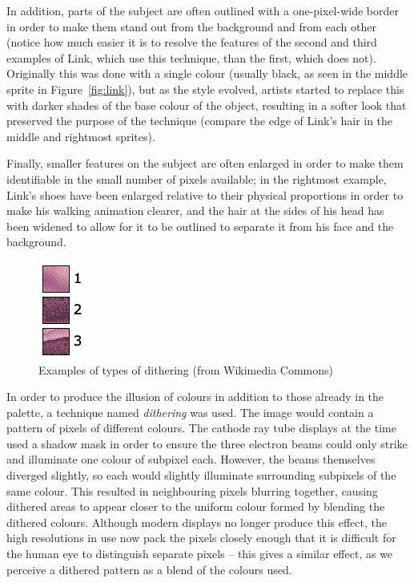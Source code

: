 \documentclass[12pt,twoside,notitlepage]{report}
\begin{document}
In addition, parts of the subject are often outlined with a one-pixel-wide border in order to make them stand out from the background and from each other (notice how much easier it is to resolve the features of the second and third examples of Link, which use this technique, than the first, which does not). Originally this was done with a single colour (usually black, as seen in the middle sprite in Figure~\ref{fig:link}), but as the style evolved, artists started to replace this with darker shades of the base colour of the object, resulting in a softer look that preserved the purpose of the technique (compare the edge of Link's hair in the middle and rightmost sprites).

Finally, smaller features on the subject are often enlarged in order to make them identifiable in the small number of pixels available; in the rightmost example, Link's shoes have been enlarged relative to their physical proportions in order to make his walking animation clearer, and the hair at the sides of his head has been widened to allow for it to be outlined to separate it from his face and the background.

\begin{figure}[h!]
\centering
\includegraphics{dithering}
\caption{Examples of types of dithering (from Wikimedia Commons)}
\end{figure}

In order to produce the illusion of colours in addition to those already in the palette, a technique named \textit{dithering} was used. The image would contain a pattern of pixels of different colours. The cathode ray tube displays at the time used a shadow mask in order to ensure the three electron beams could only strike and illuminate one colour of subpixel each. However, the beams themselves diverged slightly, so each would slightly illuminate surrounding subpixels of the same colour. This resulted in neighbouring pixels blurring together, causing dithered areas to appear closer to the uniform colour formed by blending the dithered colours. Although modern displays no longer produce this effect, the high resolutions in use now pack the pixels closely enough that it is difficult for the human eye to distinguish separate pixels -- this gives a similar effect, as we perceive a dithered pattern as a blend of the colours used.
\end{document}
